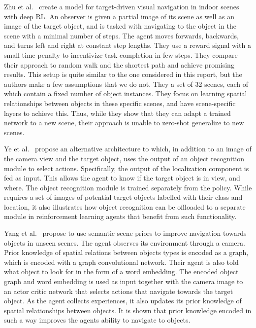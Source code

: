 Zhu et al.~\cite{zhu_target_2016} create a model for target-driven visual navigation in indoor scenes with deep RL.
An observer is given a partial image of its scene as well as an image of the target object, and is tasked with navigating to the object in the scene with a minimal number of steps.
The agent moves forwards, backwards, and turns left and right at constant step lengths.
They use a reward signal with a small time penalty to incentivize task completion in few steps.
They compare their approach to random walk and the shortest path and achieve promising results.
This setup is quite similar to the one considered in this report, but the authors make a few assumptions that we do not.
They a set of 32 scenes, each of which contain a fixed number of object instances.
They focus on learning spatial relationships between objects in these specific scenes, and have scene-specific layers to achieve this.
Thus, while they show that they can adapt a trained network to a new scene, their approach is unable to zero-shot generalize to new scenes.

Ye et al.~\cite{ye_active_2018} propose an alternative architecture to \cite{zhu_target_2016} which, in addition to an image of the camera view and the target object, uses the output of an object recognition module to select actions.
Specifically, the output of the localization component is fed as input.
This allows the agent to know if the target object is in view, and where.
The object recognition module is trained separately from the policy.
While requires a set of images of potential target objects labelled with their class and location, it also illustrates how object recognition can be offloaded to a separate module in reinforcement learning agents that benefit from such functionality.

Yang et al.~\cite{yang_semantic_2018} propose to use semantic scene priors to improve navigation towards objects in unseen scenes.
The agent observes its environment through a camera.
Prior knowledge of spatial relations between objects types is encoded as a graph, which is encoded with a graph convolutional network.
Their agent is also told what object to look for in the form of a word embedding.
The encoded object graph and word embedding is used as input together with the camera image to an actor critic network that selects actions that navigate towards the target object.
As the agent collects experiences, it also updates its prior knowledge of spatial relationships between objects.
It is shown that prior knowledge encoded in such a way improves the agents ability to navigate to objects.

